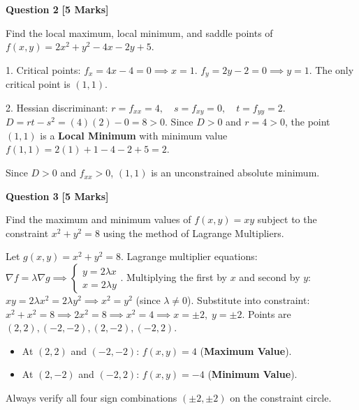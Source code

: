 \noindent\textbf{Question 2} \hfill \textbf{[5 Marks]}

Find the local maximum, local minimum, and saddle points of $f(x,y) = 2x^2 + y^2 - 4x - 2y + 5$.

\begin{solbox}
1. Critical points:
$f_x = 4x - 4 = 0 \implies x = 1$.
$f_y = 2y - 2 = 0 \implies y = 1$.
The only critical point is $(1, 1)$.

2. Hessian discriminant:
$r = f_{xx} = 4, \quad s = f_{xy} = 0, \quad t = f_{yy} = 2$.
$D = rt - s^2 = (4)(2) - 0 = 8 > 0$.
Since $D > 0$ and $r = 4 > 0$, the point $(1, 1)$ is a \textbf{Local Minimum} with minimum value $f(1,1) = 2(1)+1-4-2+5 = 2$.
\end{solbox}

\begin{examinertip}
Since $D > 0$ and $f_{xx} > 0$, $(1, 1)$ is an unconstrained absolute minimum.
\end{examinertip}

\vspace{4mm}

\noindent\textbf{Question 3} \hfill \textbf{[5 Marks]}

Find the maximum and minimum values of $f(x,y) = x y$ subject to the constraint $x^2 + y^2 = 8$ using the method of Lagrange Multipliers.

\begin{solbox}
Let $g(x,y) = x^2 + y^2 = 8$.
Lagrange multiplier equations: $\nabla f = \lambda \nabla g \implies \begin{cases} y = 2\lambda x \\ x = 2\lambda y \end{cases}$.
Multiplying the first by $x$ and second by $y$: $xy = 2\lambda x^2 = 2\lambda y^2 \implies x^2 = y^2$ (since $\lambda \ne 0$).
Substitute into constraint: $x^2 + x^2 = 8 \implies 2x^2 = 8 \implies x^2 = 4 \implies x = \pm 2, \; y = \pm 2$.
Points are $(2, 2), (-2, -2), (2, -2), (-2, 2)$.
\begin{itemize}
    \item At $(2, 2)$ and $(-2, -2)$: $f(x,y) = 4$ (\textbf{Maximum Value}).
    \item At $(2, -2)$ and $(-2, 2)$: $f(x,y) = -4$ (\textbf{Minimum Value}).
\end{itemize}
\end{solbox}

\begin{examinertip}
Always verify all four sign combinations $(\pm 2, \pm 2)$ on the constraint circle.
\end{examinertip}


